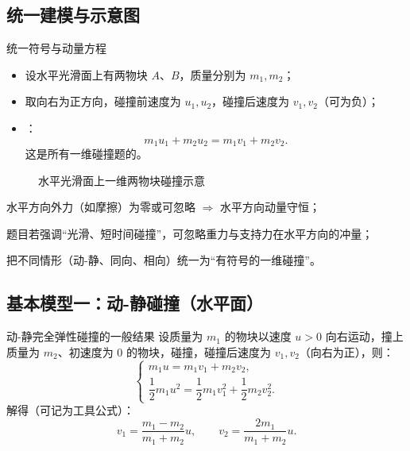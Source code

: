 \documentclass[a4paper,11pt]{ctexart}
\begin{document}
\subsection{统一建模与示意图}

\begin{conceptbox}{统一符号与动量方程}
\begin{itemize}
  \item 设水平光滑面上有两物块 $A$、$B$，质量分别为 $m_1,m_2$；
  \item 取向右为正方向，碰撞前速度为 $u_1,u_2$，碰撞后速度为 $v_1,v_2$（可为负）；
  \item {}：
  \[
    m_1u_1 + m_2u_2 = m_1v_1 + m_2v_2.
  \]
  这是所有一维碰撞题的。
\end{itemize}
\end{conceptbox}

\begin{figure}[h]
  \centering
  \caption{水平光滑面上一维两物块碰撞示意}
\end{figure}

\begin{focuspoints}
  \item 水平方向外力（如摩擦）为零或可忽略 $\Rightarrow$ 水平方向动量守恒；
  \item 题目若强调“光滑、短时间碰撞”，可忽略重力与支持力在水平方向的冲量；
  \item 把不同情形（动-静、同向、相向）统一为“有符号的一维碰撞”。
\end{focuspoints}

\subsection{基本模型一：动-静碰撞（水平面）}

\begin{definitionbox}{动-静完全弹性碰撞的一般结果}
设质量为 $m_1$ 的物块以速度 $u>0$ 向右运动，撞上质量为 $m_2$、初速度为 $0$ 的物块，碰撞，碰撞后速度为 $v_1,v_2$（向右为正），则：
\[
  \begin{cases}
    m_1u = m_1v_1 + m_2v_2,\\[0.3em]
    \dfrac12 m_1u^2 = \dfrac12 m_1v_1^2 + \dfrac12 m_2v_2^2.
  \end{cases}
\]
解得（可记为工具公式）：
\[
  v_1 = \dfrac{m_1 - m_2}{m_1 + m_2}u,\qquad
  v_2 = \dfrac{2m_1}{m_1 + m_2}u.
\]
\end{definitionbox}
\end{document}

